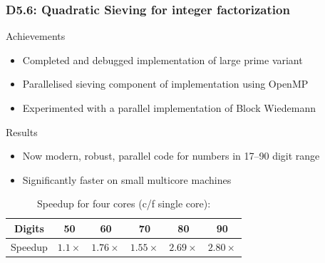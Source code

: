 \documentclass{beamer}
\begin{document}
\begin{frame}
  \frametitle{D5.6: Quadratic Sieving for integer factorization}
    \begin{block}{Achievements}
      \begin{itemize}
      \item Completed and debugged implementation of large prime variant
      \item Parallelised sieving component of implementation using OpenMP
      \item Experimented with a parallel implementation of Block Wiedemann
      \end{itemize}
\end{block}
\begin{block}{Results}

      \begin{itemize}
      \item Now modern, robust, parallel code for numbers in
        17--90 digit range \pause
      \item Significantly faster on small multicore machines
      \end{itemize}
\vspace{-1.5em}
      \begin{center}
        \begin{table}
          \caption{Speedup for four cores (c/f single core): }
        \begin{tabular}{c|ccccc}
        \toprule
            {Digits} & 50 & 60 & 70 & 80 & 90\\
            \midrule
                {Speedup} & $1.1\times$ & $1.76\times$ & $1.55\times$ & $2.69\times$ & $2.80\times$\\
                \bottomrule
      \end{tabular}
\end{table}
      \end{center}
    \end{block}

\end{frame}
\end{document}

